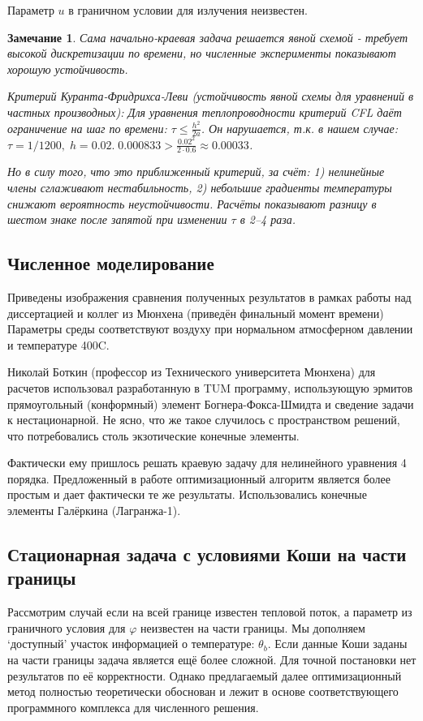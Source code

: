 \documentclass[8pt,a4paper]{article}
\newtheorem*{remark}{Замечание}
\begin{document}
    Параметр $u$ в граничном условии для излучения неизвестен.

    \begin{remark}
        Сама начально-краевая задача решается явной схемой - требует высокой дискретизации по времени,
        но численные эксперименты показывают хорошую устойчивость.

        Критерий Куранта-Фридрихса-Леви (устойчивость явной схемы для уравнений в частных производных):
        Для уравнения теплопроводности критерий CFL даёт ограничение на шаг по времени: $\tau \leq \frac{h^2}{2a}$.
        Он нарушается, т.к. в нашем случае:
        $\tau = 1/1200,\; h = 0.02. \; 0.000833 > \frac{0.02 ^ 2}{2 \cdot 0.6} \approx 0.00033$.

        Но в силу того, что это приближенный критерий,
        за счёт:
        1) нелинейные члены сглаживают нестабильность,
        2) небольшие градиенты температуры снижают вероятность неустойчивости.
        Расчёты показывают разницу в шестом знаке после запятой при изменении $\tau$ в 2--4 раза.
    \end{remark}
    \subsection*{Численное моделирование}
    Приведены изображения сравнения полученных результатов в рамках работы
    над диссертацией и коллег из Мюнхена (приведён финальный момент времени)
    Параметры среды соответствуют воздуху при нормальном атмосферном давлении и температуре 400C.


    Николай Боткин (профессор из Технического университета Мюнхена)
    для расчетов использовал разработанную в TUM программу, использующую
    эрмитов прямоугольный (конформный) элемент Богнера-Фокса-Шмидта и сведение задачи к нестационарной.
    Не ясно, что же такое случилось с пространством решений, что потребовались столь экзотические конечные элементы.

    Фактически ему пришлось решать краевую задачу для нелинейного уравнения 4 порядка.
    Предложенный в работе оптимизационный алгоритм является более простым и дает фактически те же результаты.
    Использовались конечные элементы Галёркина (Лагранжа-1).

    \subsection*{Стационарная задача с условиями Коши на части границы}
    Рассмотрим случай если на всей границе известен тепловой поток, а параметр из граничного условия
    для $\varphi$ неизвестен на части границы.
    Мы дополняем `доступный' участок информацией о температуре: $\theta_b$.
    Если данные Коши заданы на части границы задача является ещё более сложной.
    Для точной постановки нет результатов по её корректности.
    Однако предлагаемый далее оптимизационный метод полностью теоретически обоснован и
    лежит в основе соответствующего программного комплекса для численного решения.
\end{document}
